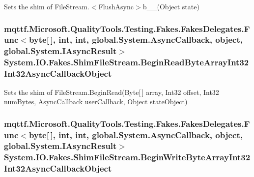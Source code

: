 Sets the shim of File\-Stream.$<$Flush\-Async$>$b\-\_\-\-\_(\-Object state)

\hypertarget{class_system_1_1_i_o_1_1_fakes_1_1_shim_file_stream_a17bdd8528af93b73e79e2670bd55647a}{
\subsubsection[{Begin\-Read\-Byte\-Array\-Int32\-Int32\-Async\-Callback\-Object}]{\setlength{\rightskip}{0pt plus 5cm}mqttf.\-Microsoft.\-Quality\-Tools.\-Testing.\-Fakes.\-Fakes\-Delegates.\-Func$<$byte\mbox{[}$\,$\mbox{]}, int, int, global.\-System.\-Async\-Callback, object, global.\-System.\-I\-Async\-Result$>$ System.\-I\-O.\-Fakes.\-Shim\-File\-Stream.\-Begin\-Read\-Byte\-Array\-Int32\-Int32\-Async\-Callback\-Object\hspace{0.3cm}{\ttfamily [set]}}}\label{class_system_1_1_i_o_1_1_fakes_1_1_shim_file_stream_a17bdd8528af93b73e79e2670bd55647a}


Sets the shim of File\-Stream.\-Begin\-Read(\-Byte\mbox{[}$\,$\mbox{]} array, Int32 offset, Int32 num\-Bytes, Async\-Callback user\-Callback, Object state\-Object)

\hypertarget{class_system_1_1_i_o_1_1_fakes_1_1_shim_file_stream_a6f88a02bb7eb440d5e79a468df280f3f}{
\subsubsection[{Begin\-Write\-Byte\-Array\-Int32\-Int32\-Async\-Callback\-Object}]{\setlength{\rightskip}{0pt plus 5cm}mqttf.\-Microsoft.\-Quality\-Tools.\-Testing.\-Fakes.\-Fakes\-Delegates.\-Func$<$byte\mbox{[}$\,$\mbox{]}, int, int, global.\-System.\-Async\-Callback, object, global.\-System.\-I\-Async\-Result$>$ System.\-I\-O.\-Fakes.\-Shim\-File\-Stream.\-Begin\-Write\-Byte\-Array\-Int32\-Int32\-Async\-Callback\-Object\hspace{0.3cm}{\ttfamily [set]}}}\label{class_system_1_1_i_o_1_1_fakes_1_1_shim_file_stream_a6f88a02bb7eb440d5e79a468df280f3f}


